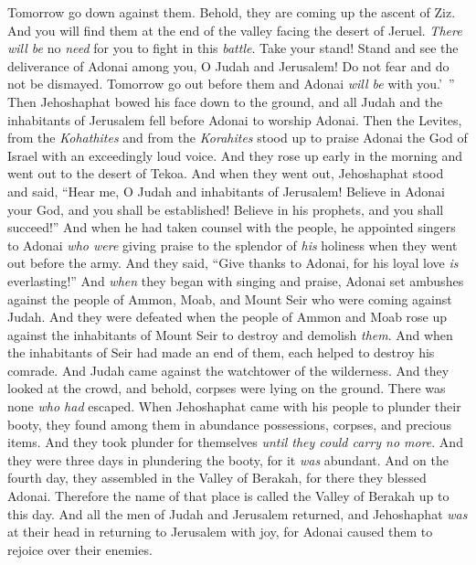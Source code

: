 \begin{biblechapter}
\verse Tomorrow go down against them. Behold, they are coming up the ascent of Ziz. And you will find them at the end of the valley facing the desert of Jeruel.
\verse \textit{There will be} no \textit{need} for you to fight in this \textit{battle}. Take your stand! Stand and see the deliverance of Adonai among you, O Judah and Jerusalem! Do not fear and do not be dismayed. Tomorrow go out before them and Adonai \textit{will be} with you.’ ”
\verse Then Jehoshaphat bowed his face down to the ground, and all Judah and the inhabitants of Jerusalem fell before Adonai to worship Adonai.
\verse Then the Levites, from the \textit{Kohathites} and from the \textit{Korahites} stood up to praise Adonai the God of Israel with an exceedingly loud voice.
 And they rose up early in the morning and went out to the desert of Tekoa. And when they went out, Jehoshaphat stood and said, “Hear me, O Judah and inhabitants of Jerusalem! Believe in Adonai your God, and you shall be established! Believe in his prophets, and you shall succeed!”
\verse And when he had taken counsel with the people, he appointed singers to Adonai \textit{who were} giving praise to the splendor of \textit{his} holiness when they went out before the army. And they said, “Give thanks to Adonai, for his loyal love \textit{is} everlasting!”
\verse And \textit{when} they began with singing and praise, Adonai set ambushes against the people of Ammon, Moab, and Mount Seir who were coming against Judah. And they were defeated
\verse when the people of Ammon and Moab rose up against the inhabitants of Mount Seir to destroy and demolish \textit{them}. And when the inhabitants of Seir had made an end of them, each helped to destroy his comrade.
\verse And Judah came against the watchtower of the wilderness. And they looked at the crowd, and behold, corpses were lying on the ground. There was none \textit{who had} escaped.
\verse When Jehoshaphat came with his people to plunder their booty, they found among them in abundance possessions, corpses, and precious items. And they took plunder for themselves \textit{until they could carry no more}. And they were three days in plundering the booty, for it \textit{was} abundant.
\verse And on the fourth day, they assembled in the Valley of Berakah, for there they blessed Adonai. Therefore the name of that place is called the Valley of Berakah up to this day.
\verse And all the men of Judah and Jerusalem returned, and Jehoshaphat \textit{was} at their head in returning to Jerusalem with joy, for Adonai caused them to rejoice over their enemies.

\end{biblechapter}
